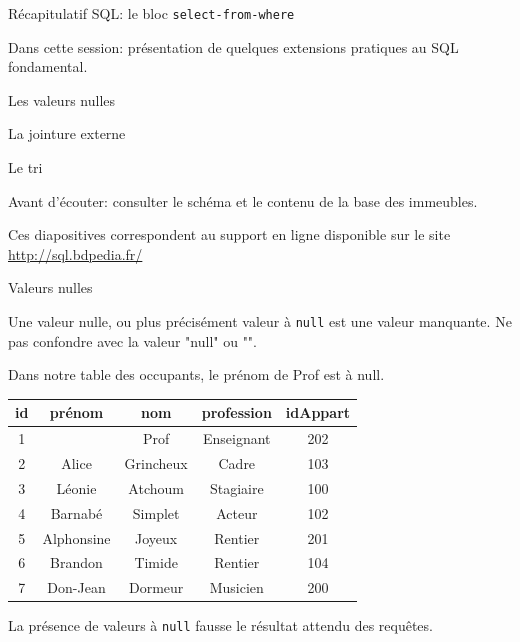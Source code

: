 
\begin{frame}[fragile]{Récapitulatif SQL: le bloc \texttt{select-from-where}}

Dans cette session: présentation de quelques extensions pratiques au SQL fondamental.
\vfill

\begin{redbullet}
  \item Les valeurs nulles
  \item La jointure externe
  \item Le tri
\end{redbullet}

\vfill

\alert{Avant d'écouter}: consulter le schéma et le contenu de la base des immeubles.

\vfill
\begin{blocgauche}
\alert{Ces diapositives correspondent au support en ligne disponible sur
le site \url{http://sql.bdpedia.fr/}}
\end{blocgauche}

\end{frame}


\begin{frame}[fragile]{Valeurs nulles}

Une \alert{valeur nulle}, ou plus précisément \alert{valeur à \texttt{null}} est une
\alert{valeur manquante}. Ne pas confondre avec la valeur "null" ou "".

\vfill

Dans notre table des occupants, le prénom de Prof est à null.

\vfill
\begin{tabular}{c|c|c|c|c}
\textbf{id} & \textbf{prénom} & \textbf{nom} & \textbf{profession} & \textbf{idAppart}\\ \hline 
1 &  & Prof & Enseignant & 202\\ \hline 
2 & Alice & Grincheux & Cadre & 103\\ \hline 
3 & Léonie & Atchoum & Stagiaire & 100\\ \hline 
4 & Barnabé & Simplet & Acteur & 102\\ \hline 
5 & Alphonsine & Joyeux & Rentier & 201\\ \hline 
6 & Brandon & Timide & Rentier & 104\\ \hline 
7 & Don-Jean & Dormeur & Musicien & 200\\ \hline 
\end{tabular}

\vfill

\begin{blocgauche}
La présence de valeurs à \texttt{null} \alert{fausse} le résultat attendu des requêtes.
\end{blocgauche}
\end{frame}


